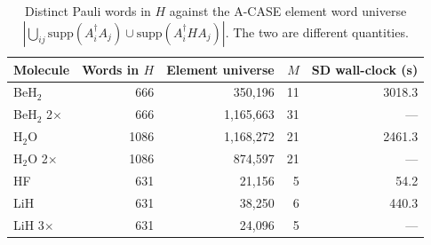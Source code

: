 \documentclass[11pt]{article}
\begin{document}
\begin{table}[h]
\centering
\caption{Distinct Pauli words in $H$ against the A-CASE element word universe $|\bigcup_{ij}\mathrm{supp}(A_i^\dagger A_j) \cup \mathrm{supp}(A_i^\dagger H A_j)|$. The two are different quantities.}
\begin{tabular}{lrrrr}
\toprule
Molecule & Words in $H$ & Element universe & $M$ & SD wall-clock (s) \\
\midrule
BeH$_2$ & 666 & 350,196 & 11 & 3018.3 \\
BeH$_2$ 2$\times$ & 666 & 1,165,663 & 31 & --- \\
H$_2$O & 1086 & 1,168,272 & 21 & 2461.3 \\
H$_2$O 2$\times$ & 1086 & 874,597 & 21 & --- \\
HF & 631 & 21,156 & 5 & 54.2 \\
LiH & 631 & 38,250 & 6 & 440.3 \\
LiH 3$\times$ & 631 & 24,096 & 5 & --- \\
\bottomrule
\end{tabular}
\end{table}
\end{document}
